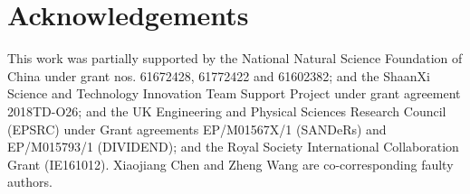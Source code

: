 \section*{Acknowledgements}
This work was partially supported by the National Natural Science Foundation of China under grant nos. 61672428, 61772422 and 61602382; and
the ShaanXi Science and Technology Innovation Team Support Project under grant agreement 2018TD-O26; and the UK Engineering and Physical
Sciences Research Council (EPSRC) under Grant agreements EP/M01567X/1 (SANDeRs) and EP/M015793/1 (DIVIDEND); and the Royal Society
International Collaboration Grant (IE161012). Xiaojiang Chen and Zheng Wang are co-corresponding faulty authors.
